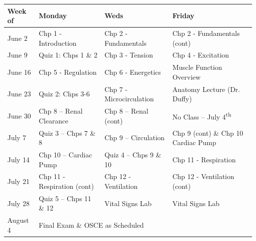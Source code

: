 \documentclass[letterpaper]{inzane_syllabus} %
\begin{document}
\begin{table}[h!]
\centering
\begin{tabular}{p{1.9cm}p{4.86cm}p{4.03cm}p{5.71cm}}
\hline
\multicolumn{1}{|p{1.9cm}}{Week of} & 
\multicolumn{1}{|p{4.86cm}}{Monday} & 
\multicolumn{1}{|p{4.03cm}}{Weds} & 
\multicolumn{1}{|p{5.71cm}|}{Friday} \\ 
\hline\hline
\multicolumn{1}{|p{1.9cm}}{June 2} & 
\multicolumn{1}{|p{4.86cm}}{Chp 1 - Introduction} & 
\multicolumn{1}{|p{4.03cm}}{Chp 2 - Fundamentals} & 
\multicolumn{1}{|p{5.71cm}|}{Chp 2 - Fundamentals (cont)} \\ 
\hline
\multicolumn{1}{|p{1.9cm}}{June 9} & 
\multicolumn{1}{|p{4.86cm}}{Quiz 1: Chps 1 \& 2 } & 
\multicolumn{1}{|p{4.03cm}}{Chp 3 - Tension} & 
\multicolumn{1}{|p{5.71cm}|}{Chp 4 - Excitation } \\ 
\hline
\multicolumn{1}{|p{1.9cm}}{June 16} & 
\multicolumn{1}{|p{4.86cm}}{Chp 5 - Regulation} & 
\multicolumn{1}{|p{4.03cm}}{Chp 6 - Energetics} & 
\multicolumn{1}{|p{5.71cm}|}{Muscle Function Overview} \\ 
\hline
\multicolumn{1}{|p{1.9cm}}{June 23} & 
\multicolumn{1}{|p{4.86cm}}{Quiz 2: Chps 3-6} & 
\multicolumn{1}{|p{4.03cm}}{Chp 7 - Microcirculation} & 
\multicolumn{1}{|p{5.71cm}|}{Anatomy Lecture (Dr. Duffy)} \\ 
\hline
\multicolumn{1}{|p{1.9cm}}{June 30} & 
\multicolumn{1}{|p{4.86cm}}{Chp 8 – Renal Clearance} & 
\multicolumn{1}{|p{4.03cm}}{Chp 8 – Renal (cont)} & 
\multicolumn{1}{|p{5.71cm}|}{No Class – July 4\textsuperscript{th}} \\ 
\hline
\multicolumn{1}{|p{1.9cm}}{July 7} & 
\multicolumn{1}{|p{4.86cm}}{Quiz 3 – Chps 7 \& 8} & 
\multicolumn{1}{|p{4.03cm}}{Chp 9 – Circulation} & 
\multicolumn{1}{|p{5.71cm}|}{Chp 9 (cont) \& Chp 10 Cardiac Pump} \\ 
\hline
\multicolumn{1}{|p{1.9cm}}{July 14} & 
\multicolumn{1}{|p{4.86cm}}{Chp 10 – Cardiac Pump } & 
\multicolumn{1}{|p{4.03cm}}{Quiz 4 – Chps 9 \& 10 } & 
\multicolumn{1}{|p{5.71cm}|}{Chp 11 - Respiration} \\ 
\hline
\multicolumn{1}{|p{1.9cm}}{July 21} & 
\multicolumn{1}{|p{4.86cm}}{Chp 11 - Respiration (cont)} & 
\multicolumn{1}{|p{4.03cm}}{Chp 12 - Ventilation} & 
\multicolumn{1}{|p{5.71cm}|}{Chp 12 - Ventilation (cont)} \\ 
\hline
\multicolumn{1}{|p{1.9cm}}{July 28} & 
\multicolumn{1}{|p{4.86cm}}{Quiz 5 – Chps 11 \& 12} & 
\multicolumn{1}{|p{4.03cm}}{Vital Signs Lab} & 
\multicolumn{1}{|p{5.71cm}|}{Vital Signs Lab} \\ 
\hline\hline
\multicolumn{1}{|p{1.9cm}}{August 4} & 
\multicolumn{3}{|p{14.6cm}|}{\centering
Final Exam \& OSCE as Scheduled} \\ 
\hline\hline
\end{tabular}
\end{table}
\end{document}
